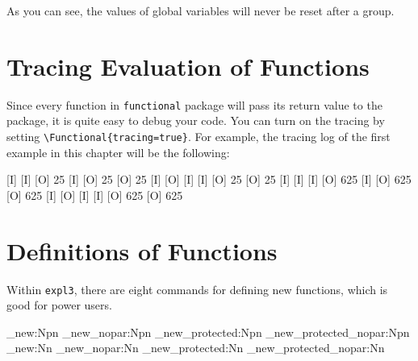 \documentclass[oneside]{book}
\begin{document}
As you can see, the values of global variables will never be reset after a group.

\section{Tracing Evaluation of Functions}

Since every function in \verb!functional! package will pass its return value to
the package, it is quite easy to debug your code.
You can turn on the tracing by setting \verb!\Functional{tracing=true}!.
For example, the tracing log of the first example in this chapter will be the following:

\begin{codehigh}[]
[I] 
        [I] 
                [I] 
                [O] 25
            [I] 
            [O] 25
        [O] 25
    [I] \IntSet{}
    [O]
        [I] \Value{}
    [I] 
    [O] 25
[O] 25
[I] 
        [I] 
                [I] 
                [O] 625
            [I] 
            [O] 625
        [O] 625
    [I] \IntSet{}
    [O]
        [I] \Value{}
    [I] 
    [O] 625
[O] 625
\end{codehigh}

\section{Definitions of Functions}

Within \verb!expl3!, there are eight commands for defining new functions,
which is good for power users.

\begin{code}
\cs_new:Npn
\cs_new_nopar:Npn
\cs_new_protected:Npn
\cs_new_protected_nopar:Npn
\cs_new:Nn
\cs_new_nopar:Nn
\cs_new_protected:Nn
\cs_new_protected_nopar:Nn
\end{code}
\end{document}
